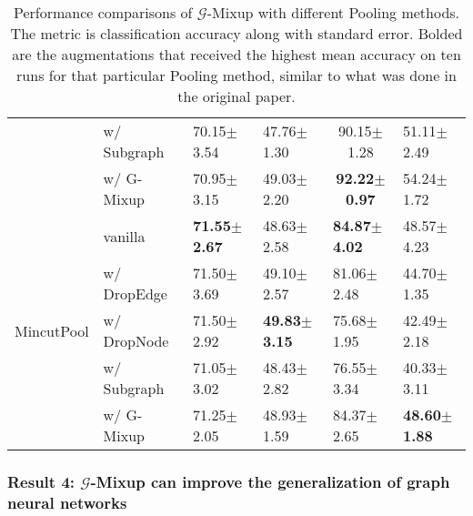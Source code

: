\begin{table}[H]
\begin{tabular}{clllcl}
                            & w/ Subgraph                     & 70.15$\pm$3.54                              & 47.76$\pm$1.30                              & 90.15$\pm$1.28                              & 51.11$\pm$2.49                              \\
                            & w/ G-Mixup                      & 70.95$\pm$3.15                              & 49.03$\pm$2.20                              & \textbf{92.22$\pm$0.97}                     & 54.24$\pm$1.72                              \\ \hline
\multirow{5}{*}{MincutPool} & vanilla                         & \textbf{71.55$\pm$2.67}                     & 48.63$\pm$2.58                              & \multicolumn{1}{l}{\textbf{84.87$\pm$4.02}} & 48.57$\pm$4.23                              \\
                            & w/ DropEdge                     & 71.50$\pm$3.69                              & 49.10$\pm$2.57                              & \multicolumn{1}{l}{81.06$\pm$2.48}          & 44.70$\pm$1.35                              \\
                            & w/ DropNode                     & 71.50$\pm$2.92                              & \textbf{49.83$\pm$3.15}                     & \multicolumn{1}{l}{75.68$\pm$1.95}          & 42.49$\pm$2.18                              \\
                            & w/ Subgraph                     & 71.05$\pm$3.02                              & 48.43$\pm$2.82                              & \multicolumn{1}{l}{76.55$\pm$3.34}          & 40.33$\pm$3.11                              \\
                            & w/ G-Mixup                      & 71.25$\pm$2.05                              & 48.93$\pm$1.59                              & \multicolumn{1}{l}{84.37$\pm$2.65}          & \textbf{48.60$\pm$1.88}                     \\ \hline
\end{tabular}
\caption{Performance comparisons of $\mathcal{G}$-Mixup with different Pooling methods. The metric is classification accuracy along with standard error. Bolded are the augmentations that received the highest mean accuracy on ten runs for that particular Pooling method, similar to what was done in the original paper.}
\label{tableexp3-2}
\end{table}

\subsubsection{Result 4: $\mathcal{G}$-Mixup can improve the generalization of graph neural networks} 

